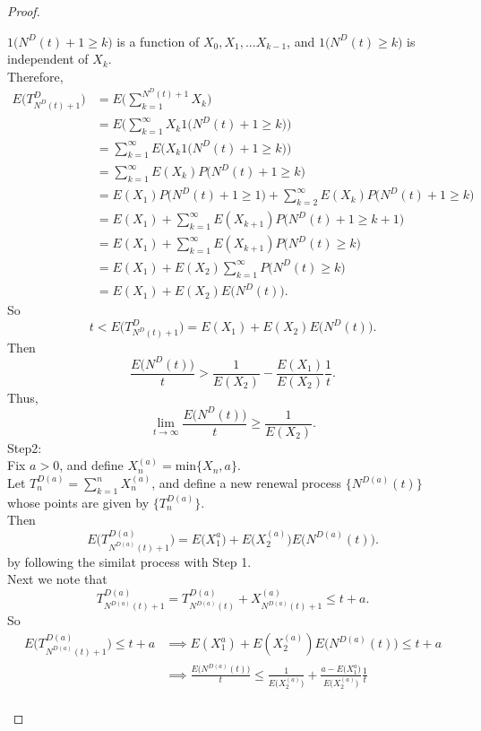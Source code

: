 \documentclass{amsart}
\theoremstyle{plain}
\theoremstyle{definition}
\begin{document}
\begin{proof}
\begin{enumerate}[(a)]
	$1\big({N^D(t)+1 \geq k}\big)$ is a function of $X_0,X_1,...X_{k-1}$, and $1\big({N^D(t) \geq k}\big)$ is independent of $X_k$.\\
	Therefore,
	\begin{align*}
		E\big(T^D_{N^D(t)+1}\big)   &= E\Bigg( \sum_{k=1}^{N^D(t)+1}X_k \Bigg) \\
								  	&= E\Big( \sum_{k=1}^{\infty}X_k1\big({N^D(t)+1 \geq k}\big) \Big) \\
									&= \sum_{k=1}^{\infty}E\bigg(X_k1\big({N^D(t)+1 \geq k}\big)\bigg)\\
		 			   			   	&= \sum_{k=1}^{\infty}E(X_k)P\big({N^D(t)+1 \geq k}\big)\\
		 			   			   	&= E(X_1)P\big({N^D(t)+1 \geq 1}\big) + \sum_{k=2}^{\infty}E(X_k)P\big({N^D(t)+1 \geq k}\big)\\
		 			   			   	&= E(X_1) + \sum_{k=1}^{\infty}E(X_{k+1})P\big({N^D(t)+1 \geq k+1}\big)\\
		 			   			   	&= E(X_1) + \sum_{k=1}^{\infty}E(X_{k+1})P\big({N^D(t) \geq k}\big)\\
		 			   			   	&= E(X_1) + E(X_2)\sum_{k=1}^{\infty}P\big({N^D(t) \geq k}\big)\\
									&= E(X_1) +  E(X_2)E\big(N^D(t)\big).
	\end{align*}
	So 
	\[ t < E\big(T^D_{N^D(t)+1}\big)  = E(X_1) +  E(X_2)E\big(N^D(t)\big).\]
	Then 
	\[ \frac{E\big(N^D(t)\big)}{t} > \frac{1}{E(X_2)} - \frac{E(X_1)}{E(X_2)}\frac{1}{t}.\] 
	Thus,
	\[\lim_{t\to \infty }\frac{E\big(N^D(t)\big)}{t} \geq \frac{1}{E(X_2)}. \]
	Step2:\\
	Fix $a > 0$, and define $X_n^{(a)} = \text{min}\{X_n,a\}$.\\
	Let ${T^{D(a)}_n} = \sum_{k=1}^nX_n^{(a)}$, and define a new renewal process $\{N^{D(a)}(t)\}$ whose points are given by $\{T^{D(a)}_n\}$.\\
	Then 
	\[ E\Big( T^{D(a)}_{N^{D(a)}(t) + 1}\Big) = E\big(X_1^{a}\big) +  E\big(X_2^{(a)}\big)E\big(N^{D(a)}(t)\big).\]
	by following the similat process with Step 1.\\
	Next we note that 
	\[ T^{D(a)}_{N^{D(a)}(t) + 1} = T^{D(a)}_{N^{D(a)}(t)} + X_{N^{D(a)}(t) + 1}^{(a)} \leq t + a.\]
	So
	\begin{align*}
		E\Big( T^{D(a)}_{N^{D(a)}(t) + 1}\Big) \leq t+a & \implies
		E(X_1^{a}) +  E(X_2^{(a)})E\big(N^{D(a)}(t)\big) \leq t+a  \\
		& \implies \frac{E\big(N^{D(a)}(t)\big)}{t} \leq \frac{1}{E\big(X_2^{(a)}\big)}+\frac{a-E\big(X_1^a\big)}{E\big(X_2^{(a)}\big)}\frac{1}{t}\\

\end{align*}
\end{enumerate}
\end{proof}
\end{document}
